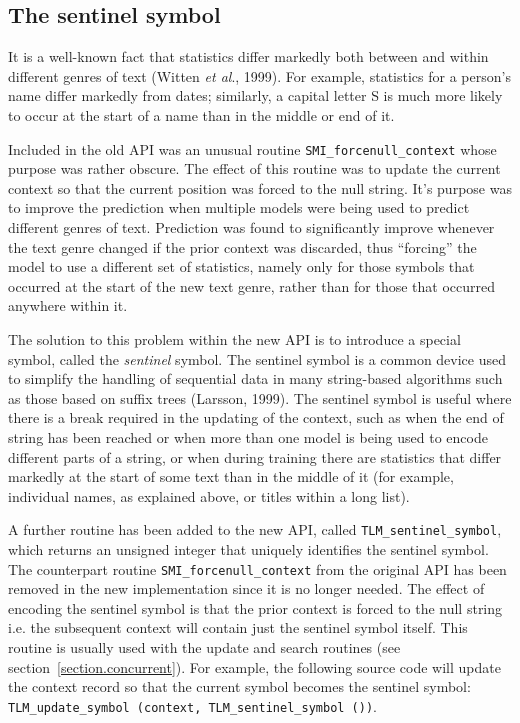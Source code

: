 \documentclass[11pt]{article}
\begin{document}
\subsection{The sentinel symbol}

It is a well-known fact that statistics differ markedly both between and within different genres of text
(Witten {\em et al}., 1999). For example, statistics for a person's name differ markedly from dates; similarly,
a capital letter S is much more likely to occur at the start of a name than in the middle or end of it.

Included in the old API was an unusual routine \verb|SMI_forcenull_context| whose purpose
was rather obscure. The effect of this routine was to update the current context so that the current
position was forced to the null string. It's purpose was to improve the prediction when multiple
models were being used to predict different genres of text. Prediction was found to significantly
improve whenever the text genre changed if the prior context was discarded, thus ``forcing'' the model to use
a different set of statistics, namely only for those symbols that occurred at the start of the new text genre,
rather than for those that occurred anywhere within it.

The solution to this problem within the new API is to introduce a special symbol, called
the {\em sentinel} symbol. The sentinel symbol is a common device used to simplify the handling of
sequential data in many string-based algorithms such as those based on suffix trees (Larsson, 1999).
The sentinel symbol is useful where there is a break required in the
updating of the context, such as when the end of string has been reached
or when more than one model is being used to encode different parts of a string,
or when during training there are statistics that differ markedly at the start of
some text than in the middle of it (for example, individual names, as explained above,
or titles within a long list).

A further routine has been added to the new API, called \verb|TLM_sentinel_symbol|,
which returns an unsigned integer that uniquely identifies the sentinel symbol.
The counterpart routine \verb|SMI_forcenull_context|
from the original API has been removed in the new
implementation since it is no longer needed.
The effect of encoding the sentinel symbol is that the prior
context is forced to the null string i.e. the subsequent context will contain
just the sentinel symbol itself. This routine is usually used with
the update and search routines (see section~\ref{section.concurrent}).
For example, the following source code will update the
context record so that the current symbol becomes the sentinel symbol:
\verb|TLM_update_symbol (context, TLM_sentinel_symbol ())|.
\end{document}
